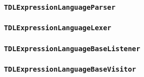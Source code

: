 \documentclass[12pt,oneside,a4paper,notitlepage]{report}
\begin{document}
	\subsubsection*{\texttt{TDLExpressionLanguageParser}}
	\par 

	\subsubsection*{\texttt{TDLExpressionLanguageLexer}}
	\par 

	\subsubsection*{\texttt{TDLExpressionLanguageBaseListener}}
	\par 

	\subsubsection*{\texttt{TDLExpressionLanguageBaseVisitor}}
	\par 


	\printbibliography[
		title=Sources
	]
\end{document}
